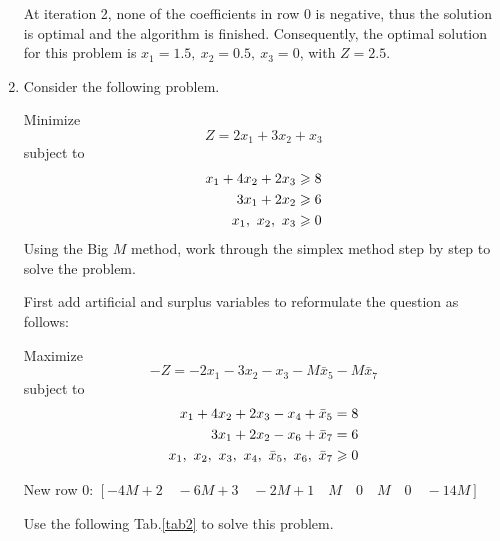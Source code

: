 \documentclass[a4paper]{article}
\begin{document}
\begin{enumerate}
\begin{solution}
\begin{table}[h]
\begin{tabular}{ccccccccccc}
  			\bottomrule[1.5pt]
  		\end{tabular}
  	\end{table}
  
  At iteration 2, none of the coefficients in row 0 is negative, thus the solution is optimal and the algorithm is finished. Consequently, the optimal solution for this problem is $x_1=1.5,\ x_2=0.5,\ x_3=0$, with $Z=2.5$.
  \end{solution}

\item Consider the following problem.
	
	 Minimize $$Z=2x_1+3x_2+x_3$$
	subject to
	\begin{equation*}
	\begin{aligned}
	x_1+4x_2+2x_3&\geqslant 8\\
	3x_1+2x_2&\geqslant 6\\
	x_1,\ x_2,\ x_3&\geqslant 0\\
	\end{aligned}
	\end{equation*}
	Using the Big $M$ method, work through the simplex method step by step to solve the problem.
\begin{solution}
	First add artificial and surplus variables to reformulate the question as follows:
	
	Maximize $$-Z=-2x_1-3x_2-x_3-M\bar{x}_5-M\bar{x}_7$$
	subject to
	\begin{equation*}
	\begin{aligned}
	x_1+4x_2+2x_3-x_4+\bar{x}_5&= 8\\
	3x_1+2x_2-x_6+\bar{x}_7&= 6\\
	x_1,\ x_2,\ x_3,\ x_4,\ \bar{x}_5,\ x_6,\ \bar{x}_7&\geqslant 0\\
	\end{aligned}
	\end{equation*}
	
	New row 0: $[-4M+2\quad -6M+3\quad -2M+1\quad  M\quad 0\quad M\quad 0\quad -14M]$
	
	Use the following Tab.\ref{tab2} to solve this problem.
	\renewcommand\arraystretch{2.2}
	\begin{table}[h]
		\centering
		\caption{The Big $M$ method}
		\label{tab2}
\end{table}
\end{solution}
\end{enumerate}
\end{document}
